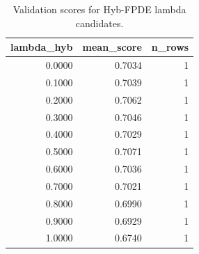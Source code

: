 \begin{table}[t]
\caption{Validation scores for Hyb-FPDE lambda candidates.}
\label{tab:lambda_distribution_computed}
\centering
\begin{tabular}{rrr}
\toprule
lambda\_hyb & mean\_score & n\_rows \\
\midrule
0.0000 & 0.7034 & 1 \\
0.1000 & 0.7039 & 1 \\
0.2000 & 0.7062 & 1 \\
0.3000 & 0.7046 & 1 \\
0.4000 & 0.7029 & 1 \\
0.5000 & 0.7071 & 1 \\
0.6000 & 0.7036 & 1 \\
0.7000 & 0.7021 & 1 \\
0.8000 & 0.6990 & 1 \\
0.9000 & 0.6929 & 1 \\
1.0000 & 0.6740 & 1 \\
\bottomrule
\end{tabular}

\end{table}
